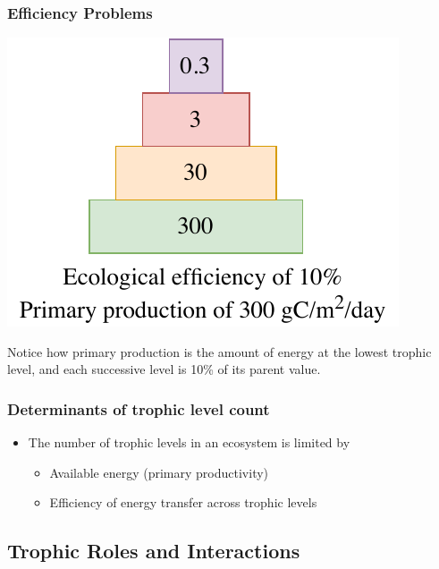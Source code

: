 \documentclass[12pt]{article}
\begin{document}
\subsubsection{Efficiency Problems}

\begin{center}
    \includegraphics[]{week9-efficiency-problem.pdf}
\end{center}

Notice how primary production is the amount of energy at the lowest trophic level, and each successive level is 10\% of its parent value.

\subsubsection{Determinants of trophic level count}
\begin{itemize}
    \item The number of trophic levels in an ecosystem is limited by
          \begin{itemize}
              \item Available energy (primary productivity)
              \item Efficiency of energy transfer across trophic levels
          \end{itemize}
\end{itemize}

\subsection{Trophic Roles and Interactions}
\end{document}
